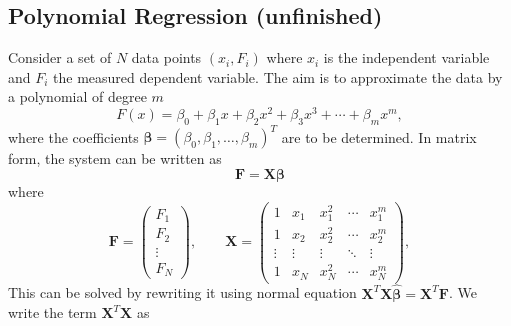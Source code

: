 \documentclass[../../../main.tex]{subfiles}
\begin{document}
\subsection{Polynomial Regression (unfinished)}
Consider a set of $N$ data points $(x_i,F_i)$ where $x_i$ is the independent variable and $F_i$ the measured dependent variable.
The aim is to approximate the data by a polynomial of degree $m$
\begin{equation}
    F(x) = \beta_0 + \beta_1 x + \beta_2 x^2 + \beta_3 x^3 + \cdots + \beta_m x^m,
\end{equation}
where the coefficients \(\boldsymbol{\beta} = (\beta_0, \beta_1, \ldots, \beta_m)^{T}\) are to be determined.
In matrix form, the system can be written as
\begin{equation}
    \mathbf{F} = \mathbf{X}\boldsymbol{\beta}
\end{equation}
where
\begin{equation}
    \mathbf{F} =
    \begin{pmatrix}
        F_1 \\ F_2 \\ \vdots \\ F_N
    \end{pmatrix},
    \qquad
    \mathbf{X} =
    \begin{pmatrix}
        1      & x_1    & x_1^2  & \cdots & x_1^m  \\
        1      & x_2    & x_2^2  & \cdots & x_2^m  \\
        \vdots & \vdots & \vdots & \ddots & \vdots \\
        1      & x_N    & x_N^2  & \cdots & x_N^m
    \end{pmatrix},
\end{equation}
This can be solved by rewriting it using normal equation $    \mathbf{X}^{T}\mathbf{X}\hat{\boldsymbol{\beta}} = \mathbf{X}^{T}\mathbf{F}$.
We write the term $    \mathbf{X}^{T}\mathbf{X}$ as
\end{document}
